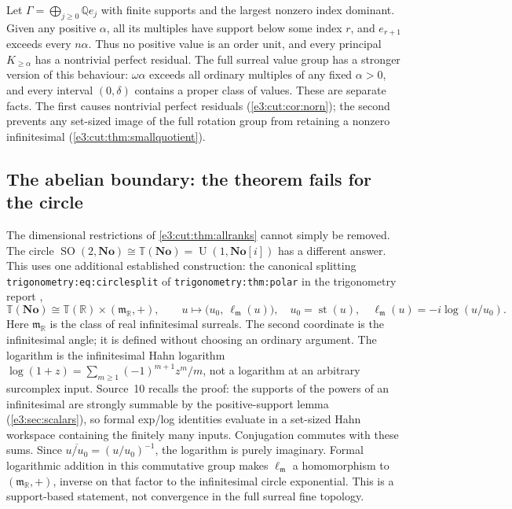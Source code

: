 \documentclass[11pt,letterpaper]{article}
\numberwithin{equation}{section}
\theoremstyle{definition}
\theoremstyle{remark}
\newcommand{\No}{\mathbf{No}}
\newcommand{\R}{\mathbb R}
\newcommand{\Q}{\mathbb Q}
\newcommand{\TT}{\mathbb T}
\newcommand{\mm}{\mathfrak m}
\newcommand{\st}{\operatorname{st}}
\newcommand{\SO}{\operatorname{SO}}
\newcommand{\Un}{\operatorname{U}}
\begin{document}
Let $\Gamma=\bigoplus_{j\ge0}\Q e_j$ with finite supports and the largest nonzero
index dominant. Given any positive $\alpha$, all its multiples have support
below some index $r$, and $e_{r+1}$ exceeds every $n\alpha$. Thus no positive
value is an order unit, and every principal $K_{\ge\alpha}$ has a nontrivial
perfect residual. The full surreal value group has a stronger version of this
behaviour: $\omega\alpha$ exceeds all ordinary multiples of any fixed
$\alpha>0$, and every interval $(0,\delta)$ contains a proper class of values.
These are separate facts. The first causes nontrivial perfect residuals
(\cref{e3:cut:cor:norn}); the second prevents any set-sized image of the full
rotation group from retaining a nonzero infinitesimal
(\cref{e3:cut:thm:smallquotient}).

\subsection{The abelian boundary: the theorem fails for the circle}\label{e3:cut:sub:torus}

The dimensional restrictions of \cref{e3:cut:thm:allranks} cannot simply be
removed. The circle $\SO(2,\No)\cong\TT(\No)=\Un(1,\No[i])$ has a different
answer. This uses one additional established construction: the canonical
splitting \texttt{trigonometry:eq:circlesplit} of
\texttt{trigonometry:thm:polar} in the trigonometry report \cite{RepoTrig},
\begin{equation}\label{e3:cut:eq:torussplit}
 \TT(\No)\cong\TT(\R)\times(\mm_{\R},+),\qquad
 u\longmapsto\bigl(u_0,\ \ell_{\mm}(u)\bigr),\quad
 u_0=\st(u),\quad \ell_{\mm}(u)=-i\log(u/u_0).
\end{equation}
Here $\mm_{\R}$ is the class of real infinitesimal surreals. The second
coordinate is the infinitesimal angle; it is defined without choosing an
ordinary argument. The logarithm is the infinitesimal Hahn logarithm
$\log(1+z)=\sum_{m\ge1}(-1)^{m+1}z^m/m$, not a logarithm at an arbitrary
surcomplex input. Source~10 recalls the proof: the supports of the powers of an
infinitesimal are strongly summable by the positive-support lemma
(\cref{e3:sec:scalars}), so formal exp/log identities evaluate in a set-sized
Hahn workspace containing the finitely many inputs. Conjugation commutes with
these sums. Since $\overline{u/u_0}=(u/u_0)^{-1}$, the logarithm is purely
imaginary. Formal logarithmic addition in this commutative group makes
$\ell_{\mm}$ a homomorphism to $(\mm_{\R},+)$, inverse on that factor to the
infinitesimal circle exponential. This is a support-based statement, not
convergence in the full surreal fine topology.
\end{document}
